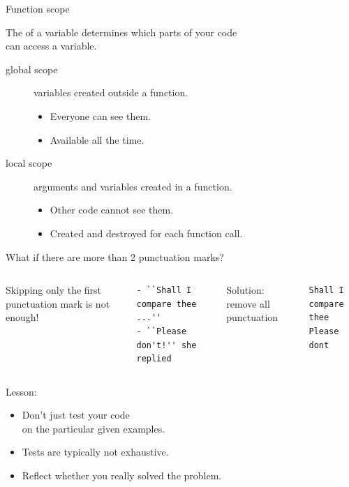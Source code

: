 \documentclass[aspectratio=169,usenames,dvipsnames]{beamer}
\begin{document}
\begin{frame}[fragile]{Function scope}
    \begin{definition}
        The  of a variable determines which parts of your code \\
            can access a variable.
    \end{definition}
    \begin{description}
        \item[global scope] variables created outside a function.
            \begin{itemize}
                \item Everyone can see them.
                \item Available all the time.
            \end{itemize}
        \item[local scope] arguments and variables created in a function.
            \begin{itemize}
                \item Other code cannot see them.
                \item Created and destroyed for each function call.
            \end{itemize}
    \end{description}
\end{frame}


\begin{frame}[fragile]{What if there are more than 2 punctuation marks?}
    \begin{columns}[T]
Skipping only the first punctuation mark is not enough!
\begin{lstlisting}[style=plain]
- ``Shall I compare thee ...''
- ``Please don't!'' she replied
\end{lstlisting} %
\pause{}
Solution: remove all punctuation
\begin{lstlisting}[style=plain]
Shall I compare thee
Please dont
\end{lstlisting}
\end{columns}
Lesson:
    \begin{itemize}
        \item Don't just test your code \\
            on the particular given examples.
        \item Tests are typically not exhaustive.
        \item Reflect whether you really solved the problem.
    \end{itemize}
\end{frame}
\end{document}
